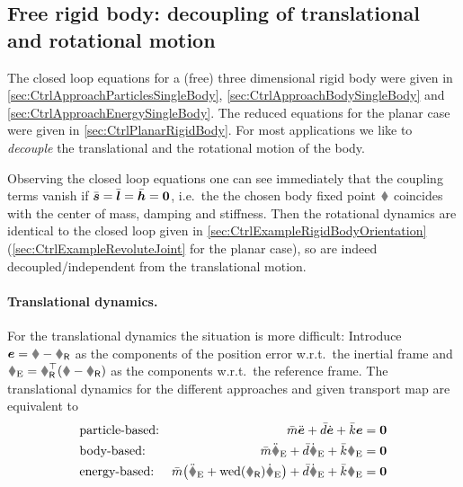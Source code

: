 \subsection{Free rigid body: decoupling of translational and rotational motion}\label{sec:DecouplingRigidBody}
The closed loop equations for a (free) three dimensional rigid body were given in \autoref{sec:CtrlApproachParticlesSingleBody}, \autoref{sec:CtrlApproachBodySingleBody} and \autoref{sec:CtrlApproachEnergySingleBody}.
The reduced equations for the planar case were given in \autoref{sec:CtrlPlanarRigidBody}.
For most applications we like to \textit{decouple} the translational and the rotational motion of the body.

Observing the closed loop equations one can see immediately that the coupling terms vanish if $\bar{\boldsymbol{s}}=\bar{\boldsymbol{l}}=\bar{\boldsymbol{h}}=\boldsymbol{0}$, i.e.\ the the chosen body fixed point $\r$ coincides with the center of mass, damping and stiffness.
Then the rotational dynamics are identical to the closed loop given in \autoref{sec:CtrlExampleRigidBodyOrientation} (\autoref{sec:CtrlExampleRevoluteJoint} for the planar case), so are indeed decoupled/independent from the translational motion.

\paragraph{Translational dynamics.}
For the translational dynamics the situation is more difficult:
Introduce $\tuple{e} = \r-\rR$ as the components of the position error w.r.t.\ the inertial frame and $\rE = \RR^\top(\r-\rR)$ as the components w.r.t.\ the reference frame.
The translational dynamics for the different approaches and given transport map are equivalent to
\begin{subequations}\label{eq:RigidBodyPosErrorDyn}
\begin{align}
 &\text{particle-based:}&
 \mc\ddot{\tuple{e}} + \dc\dot{\tuple{e}} + \kc\tuple{e} &= \tuple{0}
\\
 &\text{body-based:}&
 \mc\rEdd + \dc\rEd + \kc\rE &= \tuple{0}
\\
 &\text{energy-based:}&
 \mc \big(\rEdd + \wedOp(\wR) \rEd \big) + \dc\rEd + \kc\rE &= \tuple{0}
 \label{eq:RigidBodyPosErrorDynApproach1}
\end{align}
\end{subequations}

